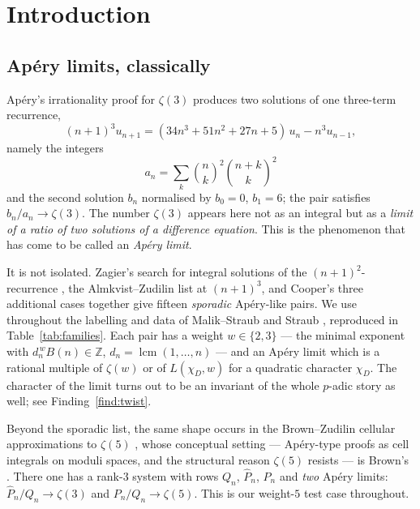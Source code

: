 \documentclass[11pt,reqno]{article}
\newcommand{\ZZ}{\mathbb{Z}}
\newcommand{\Ph}{\widehat{P}}
\DeclareMathOperator{\lcm}{lcm}
\newcommand{\bin}[2]{\binom{#1}{#2}}
\theoremstyle{plain}
\theoremstyle{definition}
\theoremstyle{remark}
\numberwithin{equation}{section}
\begin{document}
\tableofcontents

\section{Introduction}\label{sec:intro}

\subsection{Ap\'ery limits, classically}\label{ss:classical}

Ap\'ery's irrationality proof for $\zeta(3)$ \cite{Apery1979,Fischler2003}
produces two solutions of one three-term recurrence,
\begin{equation}\label{eq:apery-rec}
  (n+1)^3u_{n+1}=(34n^3+51n^2+27n+5)\,u_n-n^3u_{n-1},
\end{equation}
namely the integers
\[
  a_n=\sum_{k}\bin{n}{k}^2\bin{n+k}{k}^2
\]
and the second solution $b_n$ normalised by $b_0=0$, $b_1=6$; the pair satisfies
$b_n/a_n\to\zeta(3)$.  The number $\zeta(3)$ appears here not as an integral but
as a \emph{limit of a ratio of two solutions of a difference equation}.  This is
the phenomenon that has come to be called an \emph{Ap\'ery limit}.

It is not isolated.  Zagier's search for integral solutions of the
$(n+1)^2$-recurrence \cite{Zagier2009}, the Almkvist--Zudilin list at
$(n+1)^3$, and Cooper's three additional cases \cite{Cooper2012}
together give fifteen \emph{sporadic} Ap\'ery-like pairs.  We use throughout the
labelling and data of Malik--Straub \cite{MalikStraub} and Straub
\cite{Straub2023}, reproduced in Table~\ref{tab:families}.  Each pair has a
weight $w\in\{2,3\}$ --- the minimal exponent with $d_n^{\,w}B(n)\in\ZZ$,
$d_n=\lcm(1,\dots,n)$ --- and an Ap\'ery limit which is a rational multiple of
$\zeta(w)$ or of $L(\chi_D,w)$ for a quadratic character $\chi_D$.  The
character of the limit turns out to be an invariant of the whole $p$-adic story
as well; see Finding~\ref{find:twist}.

Beyond the sporadic list, the same shape occurs in the Brown--Zudilin cellular
approximations to $\zeta(5)$ \cite{BrownZudilin2022}, whose conceptual setting
--- Ap\'ery-type proofs as cell integrals on moduli spaces, and the structural
reason $\zeta(5)$ resists --- is Brown's \cite{Brown2014}.  There one has a rank-$3$
system with rows $Q_n$, $\Ph_n$, $P_n$ and \emph{two} Ap\'ery limits:
$\Ph_n/Q_n\to\zeta(3)$ and $P_n/Q_n\to\zeta(5)$.  This is our weight-$5$ test
case throughout.
\end{document}
